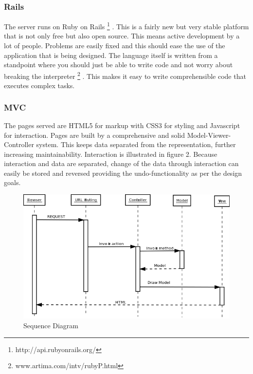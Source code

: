 \documentclass{report}
\begin{document}
				\subsubsection{Rails}
					The server runs on Ruby on Rails \footnote{http://api.rubyonrails.org/} . This is a fairly new but very stable platform that is not only free but also open source. This means active development by a lot of people. Problems are easily fixed and this should ease the use of the application that is being designed. The language itself is written from a standpoint where you should just be able to write code and not worry about breaking the interpreter \footnote{www.artima.com/intv/rubyP.html} . This makes it easy to write comprehensible code that executes complex tasks.				
				\subsubsection{MVC}
					The pages served are HTML5 for markup with CSS3 for styling and Javascript for interaction. Pages are built by a comprehensive and solid Model-Viewer-Controller system. This keeps data separated from the representation, further increasing maintainability. Interaction is illustrated in figure 2. Because interaction and data are separated, change of the data through interaction can easily be stored and reversed providing the undo-functionality as per the design goals.\\
				\begin{figure}[htb]
				\begin{center}
				\includegraphics[scale=0.50]{SequenceDiagramLife.png}
				\caption{Sequence Diagram}
				\label{fig: SequenceDiagram}
				\end{center}
				\end{figure}	
					 				 
\end{document}
